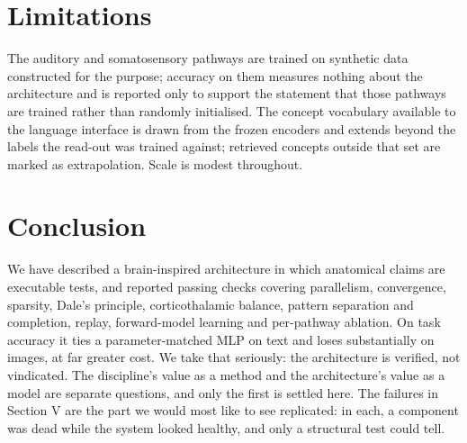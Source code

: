 \documentclass[conference]{IEEEtran}
\begin{document}
\section{Limitations}

The auditory and somatosensory pathways are trained on synthetic data
constructed for the purpose; accuracy on them measures nothing about the
architecture and is reported only to support the statement that those pathways
are trained rather than randomly initialised. The concept vocabulary available
to the language interface is drawn from the frozen encoders and extends beyond
the labels the read-out was trained against; retrieved concepts outside that set
are marked as extrapolation. Scale is modest throughout.

\section{Conclusion}

We have described a brain-inspired architecture in which anatomical claims are
executable tests, and reported \GatesPassed{} passing checks covering
parallelism, convergence, sparsity, Dale's principle, corticothalamic balance,
pattern separation and completion, replay, forward-model learning and
per-pathway ablation. On task accuracy it ties a parameter-matched MLP on text
and loses substantially on images, at far greater cost. We take that seriously:
the architecture is verified, not vindicated. The discipline's value as a method
and the architecture's value as a model are separate questions, and only the
first is settled here. The failures in Section V are the part we would most like to see
replicated: in each, a component was dead while the system looked healthy, and
only a structural test could tell.



\end{document}
